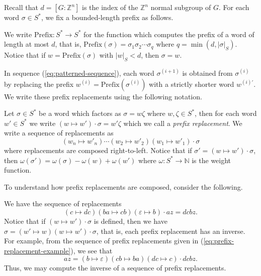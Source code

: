 Recall that $d = [G : \mathbb{Z}^n]$ is the index of the $\mathbb{Z}^n$ normal subgroup of $G$.
For each word $\sigma \in S^*$, we fix a bounded-length prefix as follows.

\begin{definition}[Prefixes]\label{rmk:short-prefix}
	We write $\mathrm{Prefix} \colon S^* \to S^*$ for the function which computes the prefix of a word of length at most $d$, that is, $\mathrm{Prefix}(\sigma) = \sigma_1 \sigma_2 \cdots \sigma_q$ where $q = \min(d,|\sigma|_S)$.
	Notice that if $w = \mathrm{Prefix}(\sigma)$ with $|w|_S < d$, then $\sigma = w$.
\end{definition}

In sequence (\ref{eq:patterned-sequence}), each word $\sigma^{(i+1)}$ is obtained from $\sigma^{(i)}$ by replacing the prefix $w^{(i)} = \mathrm{Prefix}(\sigma^{(i)})$ with a strictly shorter word $w^{(i)\prime}$.
We write these prefix replacements using the following notation.

\begin{definition}
Let $\sigma \in S^*$ be a word which factors as $\sigma = w\zeta$ where $w,\zeta \in S^*$, then for each word $w' \in S^*$ we write $(w \mapsto w') \cdot \sigma = w'\zeta$ which we call a \emph{prefix replacement}.
We write a sequence of replacements as
\[
	(w_n \mapsto w'_n)
	\cdots
	(w_2 \mapsto w'_2)
	(w_1 \mapsto w'_1)
	\cdot \sigma
\]
where replacements are composed right-to-left.
Notice that if $\sigma' = (w \mapsto w')\cdot \sigma$, then $\omega(\sigma') = \omega(\sigma) - \omega(w) + \omega(w')$ where $\omega \colon S^* \to \mathbb{N}$ is the weight function.
\end{definition}

To understand how prefix replacements are composed, consider the following.

\begin{example}\label{ex:prefix-replacement-sequence}
We have the sequence of replacements
\begin{equation}\label{eq:prefix-replacement-example}
	(c \mapsto dc)
	(ba \mapsto cb)
	(\varepsilon \mapsto b)
	\cdot
	az
	=
	dcbz.
\end{equation}
Notice that if $(w \mapsto w')\cdot \sigma$ is defined, then we have $\sigma = (w' \mapsto w)(w \mapsto w')\cdot \sigma$, that is, each prefix replacement has an inverse.
For example, from the sequence of prefix replacements given in (\ref{eq:prefix-replacement-example}), we see that
\[
	az =
	(b \mapsto \varepsilon)
	(cb \mapsto ba)
	(dc \mapsto c)
	\cdot
	dcbz.
\]
Thus, we may compute the inverse of a sequence of prefix replacements.
\end{example}

